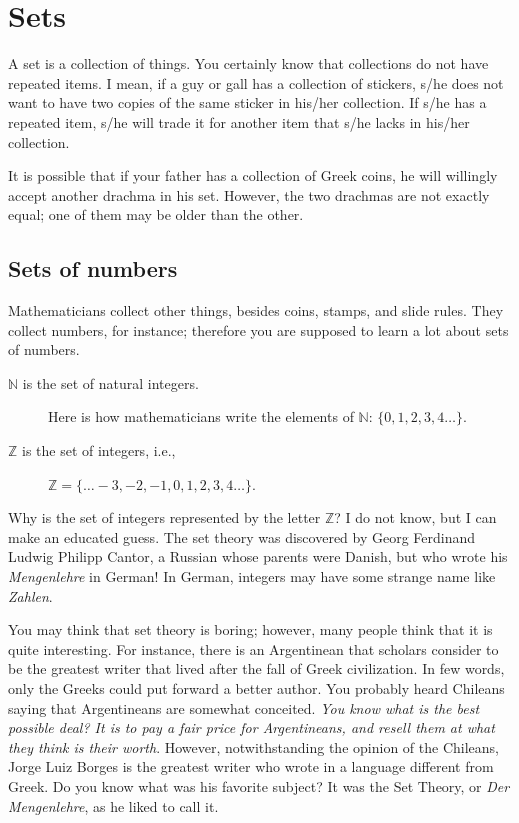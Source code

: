 \documentclass[a4paper,12pt]{book}
\begin{document}
\chapter{Sets}
A set is a collection of things. You certainly know that
collections do not have repeated items. I mean, if a guy or gall has
a collection of stickers, s/he does not want to have two
copies of the same sticker in his/her collection. If s/he has a
repeated item, s/he will trade it for another item that s/he lacks
in his/her collection.


It is possible that if your father has a collection of Greek
coins, he will willingly accept another drachma in his set.
However, the two drachmas are not exactly equal; one of them may be older
than the other.

\section{Sets of numbers}
Mathematicians collect other things, besides
coins, stamps, and slide rules. They collect numbers, for instance;
therefore you are supposed to learn a lot about sets of numbers.
\begin{description}
	\item[$\mathbb{N}$ is the set of natural integers.] Here is how mathematicians  write the
		elements of $\mathbb{N}$: $\{0,1,2,3,4\ldots\}$.
	\item[$\mathbb{Z}$ is the set of integers, i.e.,] $\mathbb{Z}=\{\ldots-3, -2, -1, 0, 1, 2, 3, 4\ldots\}$.
\end{description}


Why is the set of integers represented by the letter $\mathbb{Z}$? I do not know,
but I can make an educated guess. The set theory was discovered by Georg Ferdinand
Ludwig Philipp Cantor, a Russian whose parents were Danish, but who  wrote
his {\em Mengenlehre} in German! In German, integers may have some strange name like {\em Zahlen}.


You may think that set theory is boring; however, many people think that it is quite interesting. For instance, there is an Argentinean that scholars consider to be the greatest writer that lived after the fall of Greek civilization. In few words, only the Greeks could put forward a better author. You probably heard Chileans saying  that Argentineans are somewhat conceited. {\em You know what is the best possible deal? It is to pay a fair price for Argentineans, and resell them at what they think is their worth}. However, notwithstanding the opinion of the Chileans, Jorge Luiz Borges is the greatest writer who wrote in a language different from Greek.
Do you know what was his favorite subject? It was the Set Theory, or {\em Der Mengenlehre}, as he liked to call it.
\end{document}
